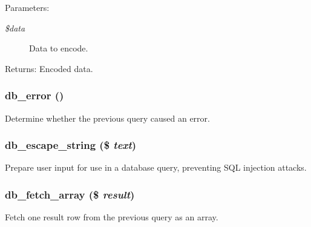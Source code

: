 \begin{Desc}
\item[Parameters:]
\begin{description}
\item[{\em \$data}]Data to encode. \end{description}
\end{Desc}
\begin{Desc}
\item[Returns:]Encoded data. \end{Desc}
\hypertarget{database_8mysql_8inc_5acae04a62f1baa2e83d189e72071bfe}{
\subsubsection[{db\_\-error}]{\setlength{\rightskip}{0pt plus 5cm}db\_\-error ()}}
\label{database_8mysql_8inc_5acae04a62f1baa2e83d189e72071bfe}


Determine whether the previous query caused an error. \hypertarget{database_8mysql_8inc_f7e6977f59f6a23327521ae3a89346f5}{
\subsubsection[{db\_\-escape\_\-string}]{\setlength{\rightskip}{0pt plus 5cm}db\_\-escape\_\-string (\$ {\em text})}}
\label{database_8mysql_8inc_f7e6977f59f6a23327521ae3a89346f5}


Prepare user input for use in a database query, preventing SQL injection attacks. \hypertarget{database_8mysql_8inc_2bd5f98fec7f21ee2c37f6b83785dcb9}{
\subsubsection[{db\_\-fetch\_\-array}]{\setlength{\rightskip}{0pt plus 5cm}db\_\-fetch\_\-array (\$ {\em result})}}
\label{database_8mysql_8inc_2bd5f98fec7f21ee2c37f6b83785dcb9}


Fetch one result row from the previous query as an array.

